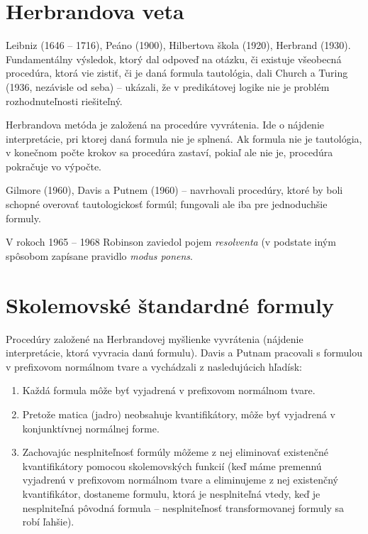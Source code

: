 \section{Herbrandova veta}
\par Leibniz (1646 -- 1716), Peáno (1900), Hilbertova škola (1920), Herbrand
(1930). Fundamentálny výsledok, ktorý dal odpoveď na otázku, či existuje
všeobecná procedúra, ktorá vie zistiť, či je daná formula tautológia, dali
Church a Turing (1936, nezávisle od seba) -- ukázali, že v predikátovej logike
nie je problém rozhodnuteľnosti riešiteľný.
\par Herbrandova metóda je založená na procedúre vyvrátenia. Ide o nájdenie
interpretácie, pri ktorej daná formula nie je splnená. Ak formula nie je
tautológia, v konečnom počte krokov sa procedúra zastaví, pokiaľ ale nie je,
procedúra pokračuje vo výpočte.

\par Gilmore (1960), Davis a Putnem (1960) -- navrhovali procedúry, ktoré by
boli schopné overovať tautologickosť formúl; fungovali ale iba pre jednoduchšie
formuly.

\par V rokoch 1965 -- 1968 Robinson zaviedol pojem \emph{resolventa} (v podstate
iným spôsobom zapísane pravidlo \emph{modus ponens}.

\section{Skolemovské štandardné formuly}
Procedúry založené na Herbrandovej myšlienke vyvrátenia (nájdenie interpretácie,
ktorá vyvracia danú formulu). Davis a Putnam pracovali s formulou v prefixovom
normálnom tvare a vychádzali z nasledujúcich hľadísk:
\begin{enumerate}
	\item Každá formula môže byť vyjadrená v prefixovom normálnom tvare.
	\item Pretože matica (jadro) neobsahuje kvantifikátory, môže byť
	vyjadrená v konjunktívnej normálnej forme.
	\item Zachovajúc nesplniteľnosť formúly môžeme z nej eliminovať
	existenčné kvantifikátory pomocou skolemovských funkcií (keď máme
	premennú vyjadrenú v prefixovom normálnom tvare a eliminujeme z nej
	existenčný kvantifikátor, dostaneme formulu, ktorá je nesplniteľná
	vtedy, keď je nesplniteľná pôvodná formula -- nesplniteľnosť
	transformovanej formuly sa robí ľahšie).
\end{enumerate}

